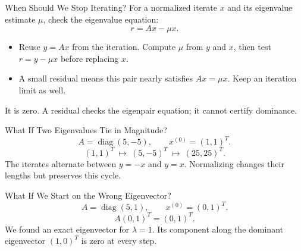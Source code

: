 \documentclass[10pt]{beamer}
\begin{document}
\begin{frame}{When Should We Stop Iterating?}
For a normalized iterate $x$ and its eigenvalue estimate $\mu$, check the eigenvalue equation:
\[
r=Ax-\mu x.
\]
\begin{itemize}
\item Reuse $y=Ax$ from the iteration. Compute $\mu$ from $y$ and $x$, then test $r=y-\mu x$ before replacing $x$.
\item A small residual means this pair nearly satisfies $Ax=\mu x$. Keep an iteration limit as well.
\end{itemize}
\pause
It is zero. A residual checks the eigenpair equation; it cannot certify dominance.
\end{frame}


\begin{frame}{What If Two Eigenvalues Tie in Magnitude?}
\[
A=\operatorname{diag}(5,-5),\qquad x^{(0)}=(1,1)^T.
\]
\pause
\[
(1,1)^T \ \longmapsto\ (5,-5)^T \ \longmapsto\ (25,25)^T .
\]
The iterates alternate between $y=-x$ and $y=x$. Normalizing changes their lengths but preserves this cycle.
\end{frame}

\begin{frame}{What If We Start on the Wrong Eigenvector?}
\[
A=\operatorname{diag}(5,1),\qquad x^{(0)}=(0,1)^T.
\]
\pause
\[
A(0,1)^T=(0,1)^T.
\]
We found an exact eigenvector for $\lambda=1$. Its component along the dominant eigenvector $(1,0)^T$ is zero at every step.
\end{frame}
\end{document}
